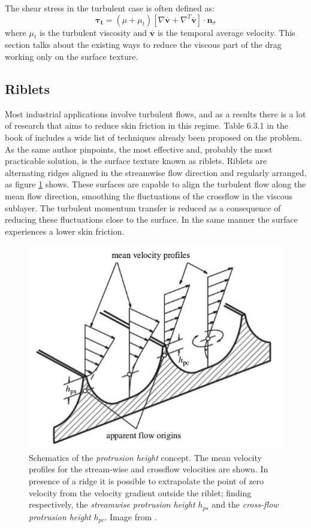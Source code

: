 \noindent The shear stress in the turbulent case is often defined as:
\begin{equation}
\boldsymbol{\tau_t} =  (\mu + \mu_t)\left[ \nabla \mathbf{\overline{v}} +  \nabla^T  \mathbf{\overline{v}} \right] \cdot  \mathbf{n}_{\sigma}
\end{equation}
where $\mu_t$ is the turbulent viscosity and $\mathbf{\overline{v}}$ is the temporal average velocity.
This section talks about the existing ways to reduce the viscous part of the drag working only on the surface texture.

\subsection{Riblets}
Most industrial applications involve turbulent flows, and as a results there is a lot of research that aims to reduce skin friction in this regime.
Table 6.3.1 in the book of \citet{mclean2012understanding} includes a wide list of techniques already been proposed on the problem.
As the same author pinpoints, the most effective and, probably the most practicable solution, is the surface texture known as riblets.
Riblets are alternating ridges aligned in the streamwise flow direction and regularly arranged, as figure \ref{fig:riblets1} shows.
These surfaces are capable to align the turbulent flow along the mean flow direction, smoothing the fluctuations of the crossflow in the viscous sublayer.
The turbulent momentum transfer is reduced as a consequence of reducing these fluctuations close to the surface. In the same manner the surface experiences a lower skin friction.

\begin{figure}[h]
	\centering
	\includegraphics[width=0.7\linewidth]{chapter_1/riblets3}
	\caption{Schematics of the  \textit{protrusion height} concept. The mean velocity profiles for the stream-wise and crossflow velocities are shown. In presence of a ridge it is possible to extrapolate the point of zero velocity from the velocity gradient outside the riblet; finding respectively, the \textit{streamwise protrusion height} $h_{ps}$ and the \textit{cross-flow protrusion height} $h_{pc}$. Image from \citet{bechert1997experiments}.}
	\label{fig:riblets1}
\end{figure}

